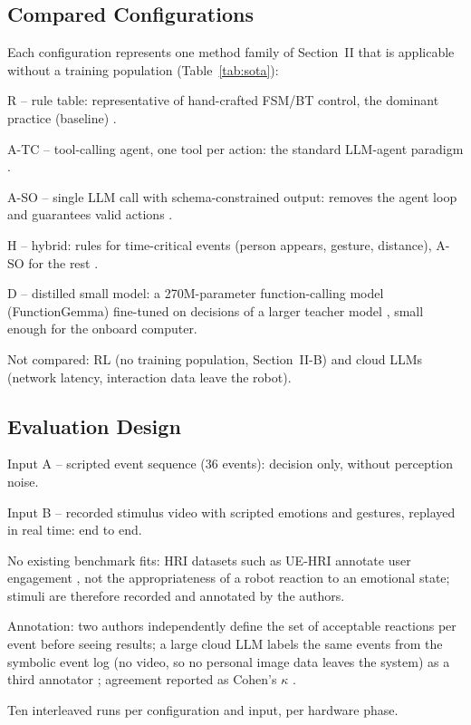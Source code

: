 \documentclass[conference]{IEEEtran}
\begin{document}
\subsection{Compared Configurations}
Each configuration represents one method family of Section~II that is
applicable without a training population (Table~\ref{tab:sota}):
\begin{points}
    \item R -- rule table: representative of hand-crafted FSM/BT control, the dominant practice (baseline) \cite{Ghzouli2023BTSM}.
    \item A-TC -- tool-calling agent, one tool per action: the standard LLM-agent paradigm \cite{Yao2023ReAct}.
    \item A-SO -- single LLM call with schema-constrained output: removes the agent loop and guarantees valid actions \cite{Willard2023Guided}.
    \item H -- hybrid: rules for time-critical events (person appears, gesture, distance), A-SO for the rest \cite{Umbrico2022Miriam}.
    \item D -- distilled small model: a 270M-parameter function-calling model (FunctionGemma) fine-tuned on decisions of a larger teacher model \cite{Hinton2015Distill}, small enough for the onboard computer.
    \item Not compared: RL (no training population, Section~II-B) and cloud LLMs (network latency, interaction data leave the robot).
\end{points}

\subsection{Evaluation Design}
\label{sec:eval}
\begin{points}
    \item Input A -- scripted event sequence (36 events): decision only, without perception noise.
    \item Input B -- recorded stimulus video with scripted emotions and gestures, replayed in real time: end to end.
    \item No existing benchmark fits: HRI datasets such as UE-HRI annotate user engagement \cite{BenYoussef2017UEHRI}, not the appropriateness of a robot reaction to an emotional state; stimuli are therefore recorded and annotated by the authors.
    \item Annotation: two authors independently define the set of acceptable reactions per event before seeing results; a large cloud LLM labels the same events from the symbolic event log (no video, so no personal image data leaves the system) as a third annotator \cite{Gilardi2023Annotation}; agreement reported as Cohen's $\kappa$ \cite{McHugh2012Kappa}.
    \item Ten interleaved runs per configuration and input, per hardware phase.
\end{points}
\end{document}
